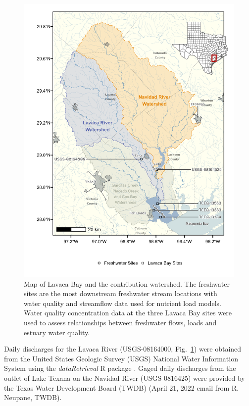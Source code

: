 \documentclass[fleqn,10pt,lineno]{wlpeerj} %
\begin{document}
\begin{figure}

{\centering \includegraphics[width=5.2in,]{../fig1} 

}

\caption{Map of Lavaca Bay and the contribution watershed. The freshwater sites are the most downstream freshwater stream locations with water quality and streamflow data used for nutrient load models. Water quality concentration data at the three Lavaca Bay sites were used to assess relationships between freshwater flows, loads and estuary water quality.}\label{fig:fig1}
\end{figure}

Daily discharges for the Lavaca River (USGS-08164000,
Fig.~\ref{fig:fig1}) were obtained from the United States Geologic
Survey (USGS) National Water Information System using the
\emph{dataRetrieval} R package
\autocite{deciccoDataRetrievalPackagesDiscovering2022}. Gaged daily
discharges from the outlet of Lake Texana on the Navidad River
(USGS-0816425) were provided by the Texas Water Development Board (TWDB)
(April 21, 2022 email from R. Neupane, TWDB).
\end{document}
